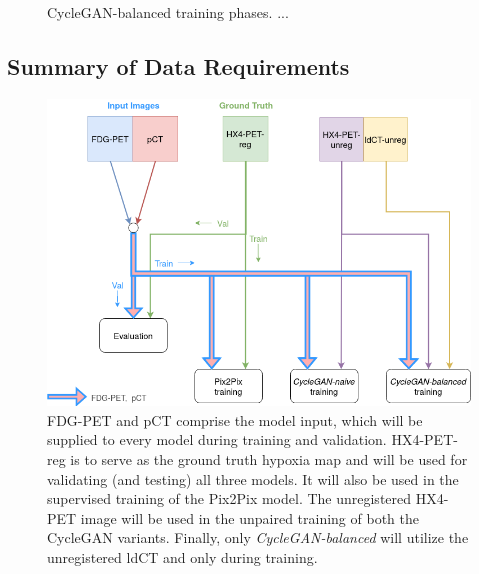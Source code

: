 \begin{figure}[h!]
    \centering
    \caption{CycleGAN-balanced training phases. ...}
    \label{fig:cyclegan_balanced}
\end{figure}{}


\subsection{Summary of Data Requirements}
\label{data_requirements}

\begin{figure}[h!]
    \centering
    \includegraphics[width=0.95\linewidth]{figures/Data/which_images_where.png}
    \caption{FDG-PET and pCT comprise the model input, which will be supplied to every model during training and validation. HX4-PET-reg is to serve as the ground truth hypoxia map and will be used for validating (and testing) all three models. It will also be used in the supervised training of the Pix2Pix model. The unregistered HX4-PET image will be used in the unpaired training of both the CycleGAN variants. Finally, only \textit{CycleGAN-balanced} will utilize the unregistered ldCT and only during training.}
    \label{fig:which_images_where}
\end{figure}


